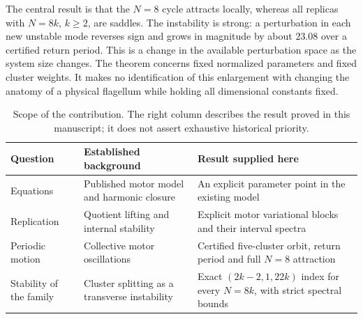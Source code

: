 \documentclass[11pt]{article}
\begin{document}
The central result is that the $N=8$ cycle attracts locally, whereas all
replicas with $N=8k$, $k\geq2$, are saddles. The instability is strong:
a perturbation in each new unstable mode reverses sign and grows in
magnitude by about $23.08$ over a certified return period. This is a
change in the available perturbation space as the system size changes.
The theorem concerns fixed normalized parameters and fixed cluster weights.
It makes no identification of this enlargement with changing the anatomy
of a physical flagellum while holding all dimensional constants fixed.

\begin{table}[t]
\centering\small
\begin{tabular}{@{}>{\raggedright\arraybackslash}p{.22\linewidth}>{\raggedright\arraybackslash}p{.35\linewidth}>{\raggedright\arraybackslash}p{.37\linewidth}@{}}
\toprule
Question & Established background & Result supplied here \\
\midrule
Equations & Published motor model and harmonic closure~\cite{alouges,oriola}
& An explicit parameter point in the existing model \\[.5em]
Replication & Quotient lifting and internal stability~\cite{aguiar,orosz,pecora,sorrentino}
& Explicit motor variational blocks and their interval spectra \\[.5em]
Periodic motion & Collective motor oscillations~\cite{oriola,alouges}
& Certified five-cluster orbit, return period and full $N=8$ attraction \\[.5em]
Stability of the family & Cluster splitting as a transverse instability
& Exact $(2k-2,1,22k)$ index for every $N=8k$, with strict spectral bounds \\
\bottomrule
\end{tabular}
\caption{Scope of the contribution. The right column describes the result
proved in this manuscript; it does not assert exhaustive historical priority.}
\label{tab:contribution}
\end{table}
\end{document}
